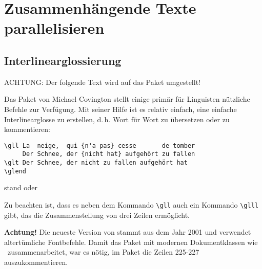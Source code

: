 \chapter{Zusammenhängende Texte parallelisieren}

\section{Interlinearglossierung}


ACHTUNG: Der folgende Text wird auf das Paket  umgestellt!

Das Paket  von Michael Covington stellt einige primär für Linguisten nützliche
Befehle zur Verfügung. Mit seiner Hilfe ist es relativ einfach, eine einfache 
Interlinearglosse zu erstellen, d.\,h. Wort für Wort zu übersetzen oder zu kommentieren:

\begin{lstlisting}
\gll La  neige,  qui {n'a pas} cesse       de tomber 
     Der Schnee, der {nicht hat} aufgehört zu fallen 
\glt Der Schnee, der nicht zu fallen aufgehört hat
\glend 
\end{lstlisting}
stand oder

Zu beachten ist, dass es neben dem Kommando \lstinline/\gll/ auch ein Kommando 
\lstinline/\glll/ gibt, das die Zusammenstellung von drei Zeilen ermöglicht.

\textbf{Achtung!} Die neueste Version von  stammt aus dem Jahr 
2001 und verwendet altertümliche Fontbefehle. Damit das Paket mit modernen Dokumentklassen 
wie \KOMAScript\ zusammenarbeitet, war es nötig, im Paket die Zeilen 225-227 auszukommentieren.
